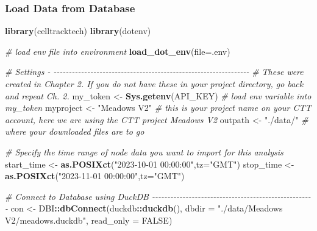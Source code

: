 \documentclass[
]{book}
\newenvironment{Shaded}{\begin{snugshade}}{\end{snugshade}}
\newcommand{\AttributeTok}[1]{\textcolor[rgb]{0.13,0.29,0.53}{#1}}
\newcommand{\CommentTok}[1]{\textcolor[rgb]{0.56,0.35,0.01}{\textit{#1}}}
\newcommand{\ConstantTok}[1]{\textcolor[rgb]{0.56,0.35,0.01}{#1}}
\newcommand{\FunctionTok}[1]{\textcolor[rgb]{0.13,0.29,0.53}{\textbf{#1}}}
\newcommand{\NormalTok}[1]{#1}
\newcommand{\OtherTok}[1]{\textcolor[rgb]{0.56,0.35,0.01}{#1}}
\newcommand{\SpecialCharTok}[1]{\textcolor[rgb]{0.81,0.36,0.00}{\textbf{#1}}}
\newcommand{\StringTok}[1]{\textcolor[rgb]{0.31,0.60,0.02}{#1}}
\begin{document}
\subsubsection{Load Data from Database}\label{load-data-from-database}

\begin{Shaded}
\begin{Highlighting}[]
\FunctionTok{library}\NormalTok{(celltracktech)}
\FunctionTok{library}\NormalTok{(dotenv)}

\CommentTok{\# load env file into environment}
\FunctionTok{load\_dot\_env}\NormalTok{(}\AttributeTok{file=}\StringTok{\textquotesingle{}.env\textquotesingle{}}\NormalTok{)}

\CommentTok{\# Settings {-} {-}{-}{-}{-}{-}{-}{-}{-}{-}{-}{-}{-}{-}{-}{-}{-}{-}{-}{-}{-}{-}{-}{-}{-}{-}{-}{-}{-}{-}{-}{-}{-}{-}{-}{-}{-}{-}{-}{-}{-}{-}{-}{-}{-}{-}{-}{-}{-}{-}{-}{-}{-}{-}{-}{-}{-}{-}{-}{-}{-}{-}{-}{-}{-}}
\CommentTok{\# These were created in Chapter 2. If you do not have these in your project directory, go back and repeat Ch. 2.}
\NormalTok{my\_token }\OtherTok{\textless{}{-}} \FunctionTok{Sys.getenv}\NormalTok{(}\StringTok{\textquotesingle{}API\_KEY\textquotesingle{}}\NormalTok{) }\CommentTok{\# load env variable into my\_token}
\NormalTok{myproject }\OtherTok{\textless{}{-}} \StringTok{"Meadows V2"} \CommentTok{\# this is your project name on your CTT account, here we are using the CTT project \textquotesingle{}Meadows V2\textquotesingle{}}
\NormalTok{outpath }\OtherTok{\textless{}{-}} \StringTok{"./data/"} \CommentTok{\# where your downloaded files are to go}

\CommentTok{\# Specify the time range of node data you want to import for this analysis}
\NormalTok{start\_time }\OtherTok{\textless{}{-}} \FunctionTok{as.POSIXct}\NormalTok{(}\StringTok{"2023{-}10{-}01 00:00:00"}\NormalTok{,}\AttributeTok{tz=}\StringTok{"GMT"}\NormalTok{)}
\NormalTok{stop\_time }\OtherTok{\textless{}{-}} \FunctionTok{as.POSIXct}\NormalTok{(}\StringTok{"2023{-}11{-}01 00:00:00"}\NormalTok{,}\AttributeTok{tz=}\StringTok{"GMT"}\NormalTok{)}

\CommentTok{\# Connect to Database using DuckDB {-}{-}{-}{-}{-}{-}{-}{-}{-}{-}{-}{-}{-}{-}{-}{-}{-}{-}{-}{-}{-}{-}{-}{-}{-}{-}{-}{-}{-}{-}{-}{-}{-}{-}{-}{-}{-}{-}{-}{-}{-}{-}{-}{-}{-}{-}{-}{-}{-}{-}{-}{-}{-}}
\NormalTok{con }\OtherTok{\textless{}{-}}\NormalTok{ DBI}\SpecialCharTok{::}\FunctionTok{dbConnect}\NormalTok{(duckdb}\SpecialCharTok{::}\FunctionTok{duckdb}\NormalTok{(), }
                      \AttributeTok{dbdir =} \StringTok{"./data/Meadows V2/meadows.duckdb"}\NormalTok{, }
                      \AttributeTok{read\_only =} \ConstantTok{FALSE}\NormalTok{)}


\end{Highlighting}
\end{Shaded}
\end{document}
